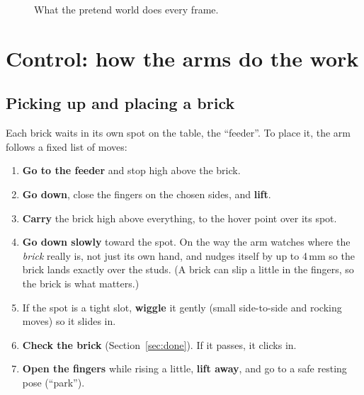 \documentclass[11pt,a4paper]{article}
\begin{document}
\begin{figure}[H]
\centering
{}
\caption{What the pretend world does every frame.}
\end{figure}

\section{Control: how the arms do the work}

\subsection{Picking up and placing a brick}

Each brick waits in its own spot on the table, the ``feeder''. To place it,
the arm follows a fixed list of moves:

\begin{enumerate}
\item \textbf{Go to the feeder} and stop high above the brick.
\item \textbf{Go down}, close the fingers on the chosen sides, and \textbf{lift}.
\item \textbf{Carry} the brick high above everything, to the hover point over its spot.
\item \textbf{Go down slowly} toward the spot. On the way the arm watches where the
      \emph{brick} really is, not just its own hand, and nudges itself by up to
      4\,mm so the brick lands exactly over the studs. (A brick can slip a little
      in the fingers, so the brick is what matters.)
\item If the spot is a tight slot, \textbf{wiggle} it gently (small side-to-side
      and rocking moves) so it slides in.
\item \textbf{Check the brick} (Section~\ref{sec:done}). If it passes, it clicks in.
\item \textbf{Open the fingers} while rising a little, \textbf{lift away}, and go
      to a safe resting pose (``park'').
\end{enumerate}
\end{document}

